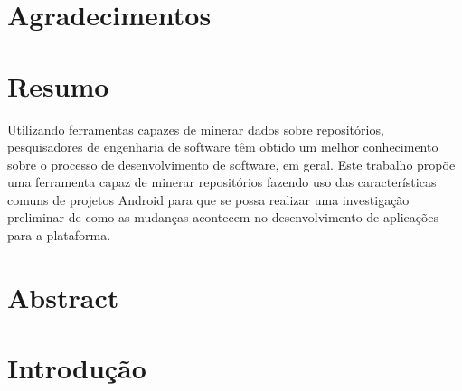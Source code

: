 \documentclass[a4paper,12pt]{article}
\begin{document}
\newpage
\section*{Agradecimentos}


\newpage
{} %
\section{Resumo}
Utilizando ferramentas capazes de minerar dados sobre repositórios, pesquisadores de engenharia de software têm obtido um melhor conhecimento sobre o processo de desenvolvimento de software, em geral. Este trabalho propõe uma ferramenta capaz de minerar repositórios fazendo uso das características comuns de projetos Android para que se possa realizar uma investigação preliminar de como as mudanças acontecem no desenvolvimento de aplicações para a plataforma. 


\newpage
\section{Abstract}


\newpage

\tableofcontents

\newpage
\section{Introdução}
\end{document}
